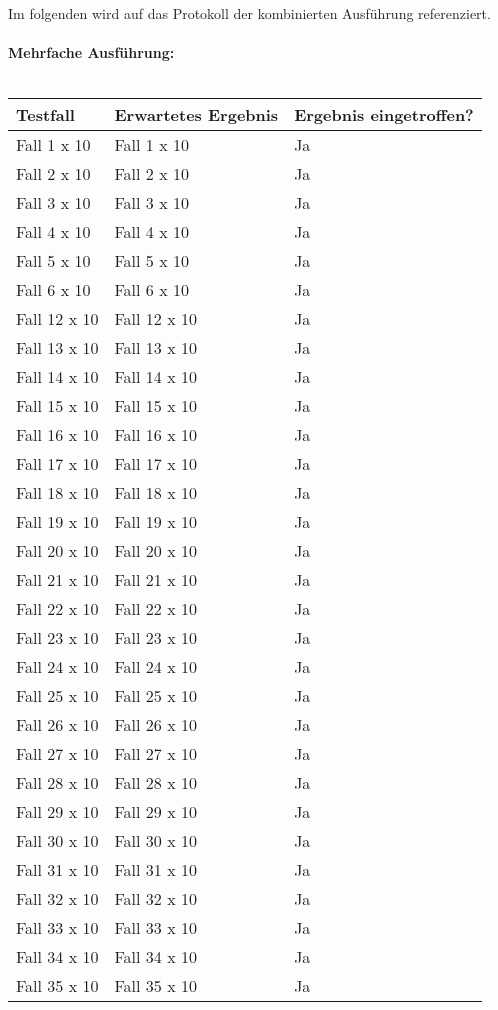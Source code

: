 \newpage
Im folgenden wird auf das Protokoll der kombinierten Ausführung referenziert.\ \\ \\
\textbf{Mehrfache Ausführung:}\ \\ \\
\begin{tabularx}{\textwidth}{|X|X|l|}
    \hline
    \textbf{Testfall} & \textbf{Erwartetes Ergebnis} & \textbf{Ergebnis eingetroffen?}\\
    \hline
    Fall 1 x 10 & Fall 1 x 10 & Ja\\
    \hline
    Fall 2 x 10 & Fall 2 x 10 & Ja\\
    \hline
    Fall 3 x 10 & Fall 3 x 10 & Ja\\
    \hline
    Fall 4 x 10 & Fall 4 x 10 & Ja\\
    \hline
    Fall 5 x 10 & Fall 5 x 10 & Ja\\
    \hline
    Fall 6 x 10 & Fall 6 x 10 & Ja\\
    \hline
    Fall 12 x 10 & Fall 12 x 10 & Ja\\
    \hline
    Fall 13 x 10 & Fall 13 x 10 & Ja\\
    \hline
    Fall 14 x 10 & Fall 14 x 10 & Ja\\
    \hline
    Fall 15 x 10 & Fall 15 x 10 & Ja\\
    \hline
    Fall 16 x 10 & Fall 16 x 10 & Ja\\
    \hline
    Fall 17 x 10 & Fall 17 x 10 & Ja\\
    \hline
    Fall 18 x 10 & Fall 18 x 10 & Ja\\
    \hline
    Fall 19 x 10 & Fall 19 x 10 & Ja\\
    \hline
    Fall 20 x 10 & Fall 20 x 10 & Ja\\
    \hline
    Fall 21 x 10 & Fall 21 x 10 & Ja\\
    \hline
    Fall 22 x 10 & Fall 22 x 10 & Ja\\
    \hline
    Fall 23 x 10 & Fall 23 x 10 & Ja\\
    \hline
    Fall 24 x 10 & Fall 24 x 10 & Ja\\
    \hline
    Fall 25 x 10 & Fall 25 x 10 & Ja\\
    \hline
    Fall 26 x 10 & Fall 26 x 10 & Ja\\
    \hline
    Fall 27 x 10 & Fall 27 x 10 & Ja\\
    \hline
    Fall 28 x 10 & Fall 28 x 10 & Ja\\
    \hline 
    Fall 29 x 10 & Fall 29 x 10 & Ja\\
    \hline
    Fall 30 x 10 & Fall 30 x 10 & Ja\\
    \hline
    Fall 31 x 10 & Fall 31 x 10 & Ja\\
    \hline
    Fall 32 x 10 & Fall 32 x 10 & Ja\\
    \hline
    Fall 33 x 10 & Fall 33 x 10 & Ja\\
    \hline
    Fall 34 x 10 & Fall 34 x 10 & Ja\\
    \hline
    Fall 35 x 10 & Fall 35 x 10 & Ja\\
    \hline
\end{tabularx}
